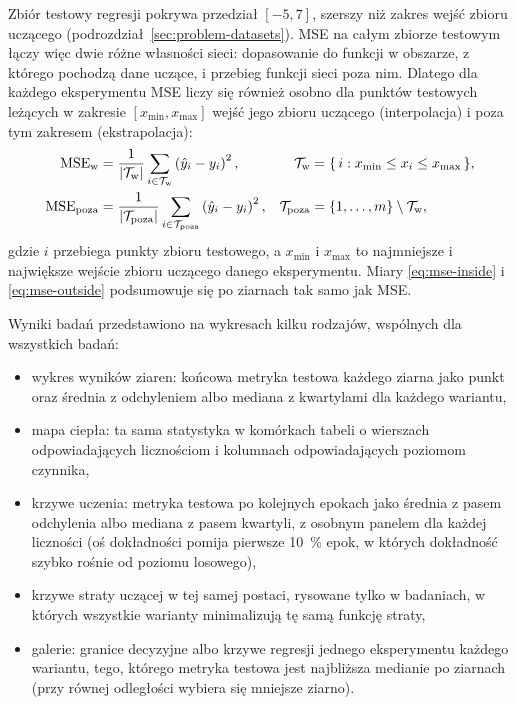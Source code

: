 Zbiór testowy regresji pokrywa przedział $[-5, 7]$, szerszy niż zakres wejść zbioru uczącego (podrozdział~\ref{sec:problem-datasets}). MSE na całym zbiorze testowym łączy więc dwie różne własności sieci: dopasowanie do funkcji w obszarze, z którego pochodzą dane uczące, i przebieg funkcji sieci poza nim. Dlatego dla każdego eksperymentu MSE liczy się również osobno dla punktów testowych leżących w zakresie $[x_{\min}, x_{\max}]$ wejść jego zbioru uczącego (interpolacja) i poza tym zakresem (ekstrapolacja):
\begin{align}
    \mathrm{MSE}_{\mathrm{w}} &= \frac{1}{\lvert \mathcal{T}_{\mathrm{w}} \rvert} \sum_{i \in \mathcal{T}_{\mathrm{w}}} \left( \hat{y}_i - y_i \right)^2 , &
    \mathcal{T}_{\mathrm{w}} &= \{\, i : x_{\min} \le x_i \le x_{\max} \,\} ,
    \label{eq:mse-inside} \\
    \mathrm{MSE}_{\mathrm{poza}} &= \frac{1}{\lvert \mathcal{T}_{\mathrm{poza}} \rvert} \sum_{i \in \mathcal{T}_{\mathrm{poza}}} \left( \hat{y}_i - y_i \right)^2 , &
    \mathcal{T}_{\mathrm{poza}} &= \{1, \dots, m\} \setminus \mathcal{T}_{\mathrm{w}} ,
    \label{eq:mse-outside}
\end{align}
gdzie $i$ przebiega punkty zbioru testowego, a $x_{\min}$ i $x_{\max}$ to najmniejsze i największe wejście zbioru uczącego danego eksperymentu. Miary \eqref{eq:mse-inside} i \eqref{eq:mse-outside} podsumowuje się po ziarnach tak samo jak MSE.

Wyniki badań przedstawiono na wykresach kilku rodzajów, wspólnych dla wszystkich badań:
\begin{itemize}
    \item wykres wyników ziaren: końcowa metryka testowa każdego ziarna jako punkt oraz średnia z odchyleniem albo mediana z kwartylami dla każdego wariantu,
    \item mapa ciepła: ta sama statystyka w komórkach tabeli o wierszach odpowiadających licznościom i kolumnach odpowiadających poziomom czynnika,
    \item krzywe uczenia: metryka testowa po kolejnych epokach jako średnia z pasem odchylenia albo mediana z pasem kwartyli, z osobnym panelem dla każdej liczności (oś dokładności pomija pierwsze \qty{10}{\percent} epok, w których dokładność szybko rośnie od poziomu losowego),
    \item krzywe straty uczącej w tej samej postaci, rysowane tylko w badaniach, w których wszystkie warianty minimalizują tę samą funkcję straty,
    \item galerie: granice decyzyjne albo krzywe regresji jednego eksperymentu każdego wariantu, tego, którego metryka testowa jest najbliższa medianie po ziarnach (przy równej odległości wybiera się mniejsze ziarno).
\end{itemize}

